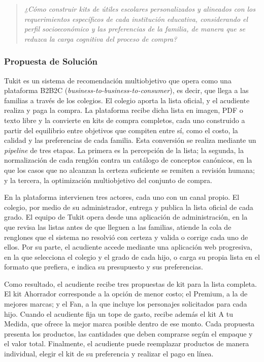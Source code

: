 \begin{quote}
\itshape ¿Cómo construir kits de útiles escolares personalizados y alineados con los
requerimientos específicos de cada institución educativa, considerando el perfil
socioeconómico y las preferencias de la familia, de manera que se reduzca la carga cognitiva
del proceso de compra?
\end{quote}

\subsubsection{Propuesta de Solución}

Tukit es un sistema de recomendación multiobjetivo que opera como una plataforma B2B2C
(\emph{business-to-business-to-consumer}), es decir, que llega a las familias a través de los
colegios. El colegio aporta la lista oficial, y el acudiente realiza y paga la compra. La
plataforma recibe dicha lista en imagen, PDF o texto libre y la convierte en kits de compra
completos, cada uno construido a partir del equilibrio entre objetivos que compiten entre
sí, como el costo, la calidad y las preferencias de cada familia. Esta conversión se realiza
mediante un \emph{pipeline} de tres etapas. La primera es la percepción de la lista; la segunda, la normalización de cada renglón contra
un catálogo de conceptos canónicos, en la que los casos que no alcanzan la certeza suficiente
se remiten a revisión humana; y la tercera, la optimización multiobjetivo del conjunto de
compra.\par

En la plataforma intervienen tres actores, cada uno con un canal propio. El colegio, por
medio de su administrador, entrega y publica la lista oficial de cada grado. El equipo de
Tukit opera desde una aplicación de administración, en la que revisa las listas antes de que
lleguen a las familias, atiende la cola de renglones que el sistema no resolvió con certeza
y valida o corrige cada uno de ellos. Por su parte, el acudiente accede mediante una
aplicación web progresiva, en la que selecciona el colegio y el grado de cada hijo, o carga
su propia lista en el formato que prefiera, e indica su presupuesto y sus preferencias.\par

Como resultado, el acudiente recibe tres propuestas de kit para la lista completa. El kit
Ahorrador corresponde a la opción de menor costo; el Premium, a la de mejores marcas; y el
Fan, a la que incluye los personajes solicitados para cada hijo. Cuando el acudiente fija un
tope de gasto, recibe además el kit A tu Medida, que ofrece la mejor marca posible dentro de
ese monto. Cada propuesta presenta los productos, las cantidades que deben comprarse según el
empaque y el valor total. Finalmente, el acudiente puede reemplazar productos de manera
individual, elegir el kit de su preferencia y realizar el pago en línea.\par

